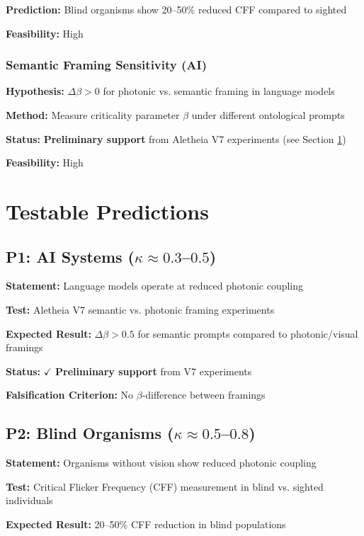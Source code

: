 \documentclass[11pt,a4paper]{article}
\begin{document}
\textbf{Prediction:} Blind organisms show 20--50\% reduced CFF compared to sighted

\textbf{Feasibility:} High

\subsubsection{Semantic Framing Sensitivity (AI)}
\textbf{Hypothesis:} $\Delta\beta > 0$ for photonic vs. semantic framing in language models

\textbf{Method:} Measure criticality parameter $\beta$ under different ontological prompts

\textbf{Status:} \textbf{Preliminary support} from Aletheia V7 experiments (see Section \ref{sec:predictions})

\textbf{Feasibility:} High

\section{Testable Predictions}
\label{sec:predictions}

\subsection{P1: AI Systems ($\kappa \approx 0.3$--$0.5$)}

\textbf{Statement:} Language models operate at reduced photonic coupling

\textbf{Test:} Aletheia V7 semantic vs. photonic framing experiments

\textbf{Expected Result:} $\Delta\beta > 0.5$ for semantic prompts compared to photonic/visual framings

\textbf{Status:} $\checkmark$ \textbf{Preliminary support} from V7 experiments

\textbf{Falsification Criterion:} No $\beta$-difference between framings

\subsection{P2: Blind Organisms ($\kappa \approx 0.5$--$0.8$)}

\textbf{Statement:} Organisms without vision show reduced photonic coupling

\textbf{Test:} Critical Flicker Frequency (CFF) measurement in blind vs. sighted individuals

\textbf{Expected Result:} 20--50\% CFF reduction in blind populations
\end{document}
